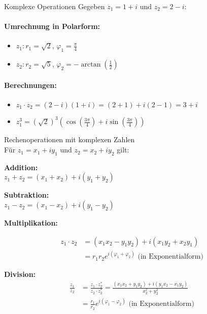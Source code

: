 \begin{example2}{Komplexe Operationen}
Gegeben $z_1 = 1+i$ und $z_2 = 2-i$:

\paragraph{Umrechnung in Polarform:}
\begin{itemize}
    \item $z_1: r_1 = \sqrt{2}$, $\varphi_1 = \frac{\pi}{4}$
    \item $z_2: r_2 = \sqrt{5}$, $\varphi_2 = -\arctan(\frac{1}{2})$
\end{itemize}

\paragraph{Berechnungen:}
\begin{itemize}
    \item $z_1 \cdot z_2 = (2-i)(1+i) = (2+1) + i(2-1) = 3+i$
    \item $z_1^3 = (\sqrt{2})^3(\cos(\frac{3\pi}{4}) + i\sin(\frac{3\pi}{4}))$
\end{itemize}
\end{example2}

\begin{theorem}{Rechenoperationen mit komplexen Zahlen}\\
Für $z_1 = x_1 + iy_1$ und $z_2 = x_2 + iy_2$ gilt:
\vspace{1mm}\\
\begin{minipage}[t]{0.45\textwidth}
    \textbf{Addition:}\\
    $z_1 + z_2 = (x_1 + x_2) + i(y_1 + y_2)$
\end{minipage}
\hspace{3mm}
\begin{minipage}[t]{0.45\textwidth}
    \textbf{Subtraktion:}\\
    $z_1 - z_2 = (x_1 - x_2) + i(y_1 - y_2)$
\end{minipage}

\begin{minipage}{0.28\textwidth}
    \textbf{Multiplikation:}
\end{minipage}
\begin{minipage}{0.68\textwidth}
    \begin{align*}
        z_1 \cdot z_2 &= (x_1x_2 - y_1y_2) + i(x_1y_2 + x_2y_1)\\
        &= r_1r_2e^{i(\varphi_1 + \varphi_2)} \text{ (in Exponentialform)}
    \end{align*}
\end{minipage}



\textbf{Division:}
\begin{align*}
    \frac{z_1}{z_2} &= \frac{z_1 \cdot z_2^*}{z_2 \cdot z_2^*} = \frac{(x_1x_2 + y_1y_2) + i(y_1x_2 - x_1y_2)}{x_2^2 + y_2^2}\\
    &= \frac{r_1}{r_2}e^{i(\varphi_1 - \varphi_2)} \text{ (in Exponentialform)}
\end{align*}
\end{theorem}

